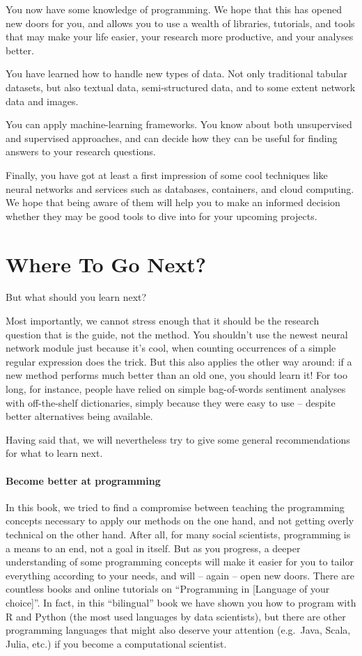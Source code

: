 You now have some knowledge of programming. We hope that this has opened new doors for you, and allows you to use a wealth of libraries, tutorials, and tools that may make your life easier, your research more productive, and your analyses better.

You have learned how to handle new types of data. Not only traditional tabular datasets, but also textual data, semi-structured data, and to some extent network data and images.

You can apply machine-learning frameworks. You know about both unsupervised and supervised approaches, and can decide  how they can be useful for finding answers to your research questions.

Finally, you have got at least a first impression of some cool techniques like neural networks and services such as databases, containers, and cloud computing. We hope that being aware of them will help you to make an informed decision whether they may be good tools to dive into for your upcoming projects.



\section{Where To Go Next?}\label{sec:wheretogo}
But what should you learn next?

Most importantly, we cannot stress enough that it should be the research question that is the guide, not the method. You shouldn't use the newest neural network module just because it's cool, when counting occurrences of a simple regular expression does the trick. But this also applies the other way around: if a new method performs much better than an old one, you should learn it! For too long, for instance, people have relied on simple bag-of-words sentiment analyses with off-the-shelf dictionaries, simply because they were easy to use -- despite better alternatives being available.

Having said that, we will nevertheless try to give some general recommendations for what to learn next.

\paragraph{Become better at programming} In this book, we tried to find a compromise between teaching the programming concepts necessary to apply our methods on the one hand, and not getting overly technical on the other hand. After all, for many social scientists, programming is a means to an end, not a goal in itself. But as you progress, a deeper understanding of some programming concepts will make it easier for you to tailor everything according to your needs, and will -- again -- open new doors. There are countless books and online tutorials on ``Programming in [Language of your choice]''. In fact, in this ``bilingual'' book we have shown you how to program with R and Python (the most used languages by data scientists), but there are other programming languages that might also deserve your attention (e.g.\ Java, Scala, Julia, etc.) if you become a computational scientist.


